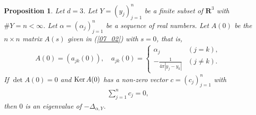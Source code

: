\documentclass[12pt,a4paper]{article}
\newtheorem{proposition}[theorem]{Proposition}
\def\Ker{\mathop{\rm Ker}\nolimits}
\begin{document}
\begin{proposition}
 \label{proposition_zeroev}
Let $d=3$.
Let $Y=(y_j)_{j=1}^n$ be a finite subset of $\mathbf{R}^3$
with $\# Y =n<\infty$.
Let $\alpha=(\alpha_j)_{j=1}^n$ be a sequence of real numbers.
Let $A(0)$ be the $n\times n$ matrix $A(s)$ given in (\ref{07_02}) with $s=0$,
that is,
\begin{align*}
 A(0)=(a_{jk}(0)),\quad
a_{jk}(0)
=
\begin{cases}
 \alpha_j  & (j=k),\\
-\frac{1}{4\pi|y_j-y_k|} & (j\not=k).
\end{cases}
\end{align*}
If  $\det A(0)=0$  and $\Ker A(0)$ has a 
non-zero vector $c=(c_j)_{j=1}^n$ with
\begin{align}
\label{zero_01}
 \sum_{j=1}^n c_j=0, 
\end{align}
then
$0$ is an eigenvalue of $-\Delta_{\alpha,Y}$.
\end{proposition}
\end{document}
